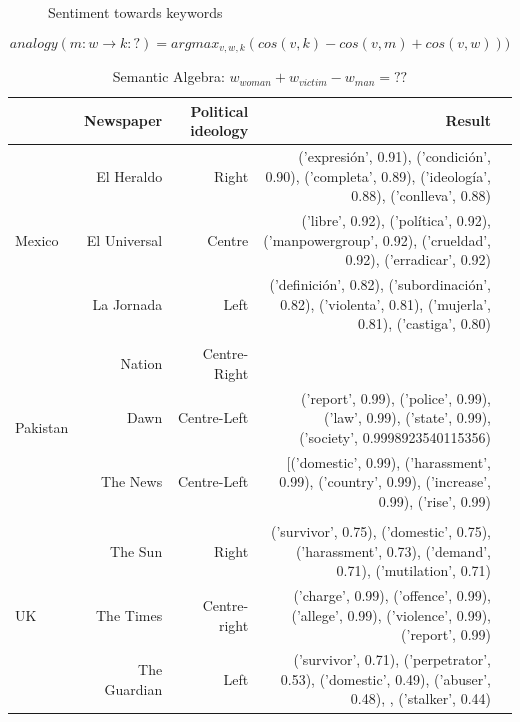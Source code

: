 \documentclass{article}
\begin{document}
{{\begin{figure}[H]
	\caption{\label{fig:my-label1} Sentiment towards keywords}
\end{figure}

\begin{equation} \label{eu_eqn}
	 analogy(m:w \rightarrow k:?) = argmax_{v,w,k}(cos(v,k)-cos(v,m)+cos(v,w)))
\end{equation}


\begin{table}[!htp]\centering
	\caption{Semantic Algebra: $w_{woman}+ w_{victim} - w_{man} = ??$}\label{tab: }
	\scriptsize
	\begin{tabular}{lrrrr}\toprule
		&\textbf{Newspaper} &\textbf{Political ideology} &\textbf{Result} \\\midrule
		\multirow{3}{*}{Mexico} &El Heraldo &Right &('expresión', 0.91), ('condición', 0.90), ('completa', 0.89), ('ideología', 0.88), ('conlleva', 0.88) \\
		&El Universal &Centre &('libre', 0.92), ('política', 0.92), ('manpowergroup', 0.92), ('crueldad', 0.92), ('erradicar', 0.92) \\
		&La Jornada &Left &('definición', 0.82), ('subordinación', 0.82), ('violenta', 0.81), ('mujerla', 0.81), ('castiga', 0.80) \\
		& & &\textbf{} \\
		\multirow{3}{*}{Pakistan} &Nation &Centre-Right & \\
		&Dawn &Centre-Left &('report', 0.99), ('police', 0.99), ('law', 0.99), ('state', 0.99), ('society', 0.9998923540115356) \\
		&The News &Centre-Left &[('domestic', 0.99), ('harassment', 0.99), ('country', 0.99), ('increase', 0.99), ('rise', 0.99) \\
		&\textbf{} &\textbf{} &\textbf{} \\
		\multirow{3}{*}{UK} &The Sun &Right &('survivor', 0.75), ('domestic', 0.75), ('harassment', 0.73), ('demand', 0.71), ('mutilation', 0.71) \\
		&The Times &Centre-right &('charge', 0.99), ('offence', 0.99), ('allege', 0.99), ('violence', 0.99), ('report', 0.99) \\
		&The Guardian &Left &('survivor', 0.71), ('perpetrator', 0.53), ('domestic', 0.49), ('abuser', 0.48), , ('stalker', 0.44) \\
		\bottomrule
	\end{tabular}
\end{table}

}}
\end{document}
